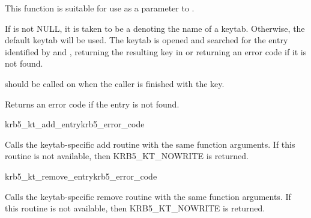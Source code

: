 This function is suitable for use as a parameter to
.

If  is not NULL, it is taken to be a
 denoting the name of a keytab.  Otherwise, the default
keytab will be used.
The keytab is opened and searched for the entry identified by
 and , returning the resulting key
in  or returning an error code if it is not found. 

 should be called on  when
the caller is finished with the key.

Returns an error code if the entry is not found.

\begin{funcdecl}{krb5_kt_add_entry}{krb5_error_code}{\funcin}
\end{funcdecl}

Calls the keytab-specific add routine 
with the same function arguments.  If this routine is not available,
then KRB5_KT_NOWRITE is returned.

\begin{funcdecl}{krb5_kt_remove_entry}{krb5_error_code}{\funcin}
\end{funcdecl}

Calls the keytab-specific remove routine
 with the same function arguments.
If this routine is not available, then KRB5_KT_NOWRITE is returned.
